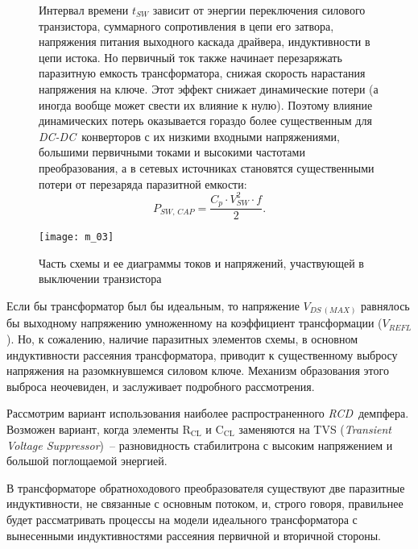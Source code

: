 \begin{figure}[h!]
	\begin{minipage}{.5\textwidth}
		Интервал времени \( t_{SW} \) зависит от энергии переключения силового
		транзистора, суммарного сопротивления в цепи его затвора, напряжения
		питания выходного каскада драйвера, индуктивности в цепи истока. Но
		первичный ток также начинает перезаряжать паразитную емкость
		трансформатора, снижая скорость нарастания напряжения на ключе. Этот
		эффект снижает динамические потери (а иногда вообще может свести их
		влияние к нулю). Поэтому влияние динамических потерь оказывается
		гораздо более существенным для \emph{DC-DC}~конверторов с их низкими
		входными напряжениями, большими первичными токами и высокими частотами
		преобразования, а в сетевых источниках становятся существенными потери
		от перезаряда паразитной емкости:
		\begin{equation}
			P_{SW,\,CAP} = \frac{C_p\cdot V_{SW}^2\cdot f}{2}.
		\end{equation}
	\end{minipage} \hfill
	\begin{minipage}{.45\textwidth}
		\texttt{[image: m\_03]}
		\parbox{\textwidth}{\caption{Часть схемы и ее диаграммы токов и
		напряжений, участвующей в выключении транзистора}\label{p03}}
	\end{minipage}
\end{figure}

Если бы трансформатор был бы идеальным, то напряжение \( V_{DS\,(MAX)} \)
равнялось бы выходному напряжению умноженному на коэффициент трансформации
(\( V_{REFL} \)). Но, к сожалению, наличие паразитных элементов схемы, в
основном индуктивности рассеяния трансформатора, приводит к существенному
выбросу напряжения на разомкнувшемся силовом ключе. Механизм образования этого
выброса неочевиден, и заслуживает подробного рассмотрения.
		
Рассмотрим вариант использования наиболее распространенного \emph{RCD}~демпфера.
Возможен вариант, когда элементы \( \mathrm{R_{CL}} \) и \( \mathrm{C_{CL}} \)
заменяются на TVS (\emph{Transient Voltage Suppressor})~-- разновидность
стабилитрона с высоким напряжением и большой поглощаемой энергией.
		
В трансформаторе обратноходового преобразователя существуют две паразитные
индуктивности, не связанные с основным потоком, и, строго говоря, правильнее
будет рассматривать процессы на модели идеального трансформатора с вынесенными
индуктивностями рассеяния первичной и вторичной стороны.

